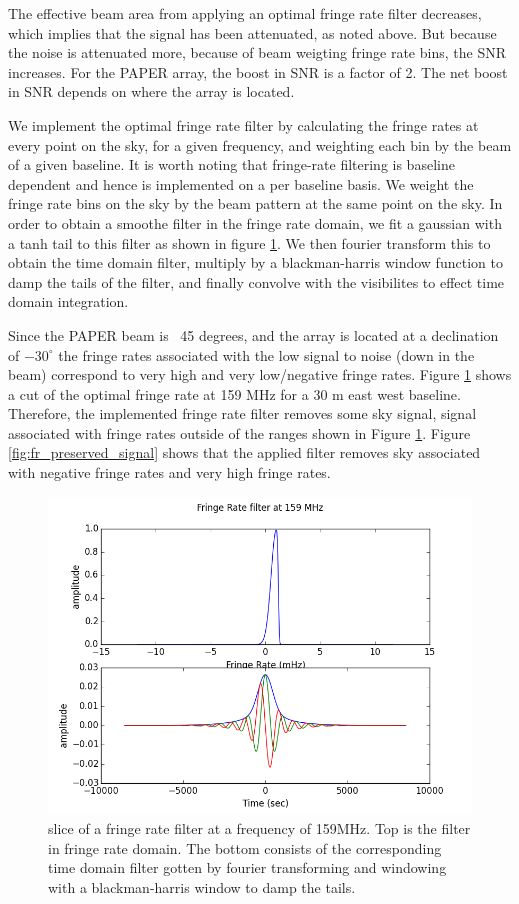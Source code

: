\documentclass[twocolumn,numberedappendix]{emulateapj} \shorttitle{PSA64}
\begin{document}
The effective beam area from applying an optimal fringe rate filter decreases,
which implies that the signal has been attenuated, as noted above. But because
the noise is attenuated more, because of beam weigting fringe rate bins, the SNR
increases. For the PAPER array, the boost in SNR is a factor of 2. The net boost
in SNR depends on where the array is located. 

We implement the optimal fringe rate filter by calculating the fringe rates at
every point on the sky, for a given frequency, and weighting each bin by the
beam of a given baseline. It is worth noting that fringe-rate filtering is
baseline dependent and hence is implemented on a per baseline basis. We weight
the fringe rate bins on the sky by the beam pattern at the same point on the
sky. In order to obtain a smoothe filter in the fringe rate domain, we fit a
gaussian with a tanh tail to this filter as shown in figure
\ref{fig:fringe_rate_cut}. We then fourier transform this to obtain the time
domain filter, multiply by a blackman-harris window function to damp the tails
of the filter, and finally convolve with the visibilites to effect time domain
integration.

Since the PAPER beam is ~45 degrees, and the array is located at a declination
of $-30^{\circ}$ the fringe rates associated with the low signal to noise (down
in the beam) correspond to very high and very low/negative fringe rates. Figure
\ref{fig:fringe_rate_cut} shows a cut of the optimal fringe rate at 159 MHz for
a 30 m east west baseline. Therefore, the implemented fringe rate filter removes
some sky signal, signal associated with fringe rates outside of the ranges shown
in Figure \ref{fig:fringe_rate_cut}. Figure \ref{fig:fr_preserved_signal} shows
that the applied filter removes sky associated with negative fringe rates and
very high fringe rates. 

\begin{figure}[!t]
\centering
\includegraphics[width=\columnwidth]{plots/fr_filter_slice.png}
\caption{slice of a fringe rate filter at a frequency of 159MHz. Top is the
filter in fringe rate domain. The bottom consists of the corresponding time
domain filter gotten by fourier transforming and windowing with a
blackman-harris window to damp the tails.}
\label{fig:fringe_rate_cut}
\end{figure}
\end{document}
